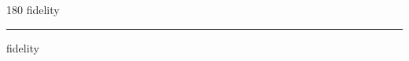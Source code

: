 
\begin{frame}
\begin{center}
\begin{turn}{180}
{\fontsize{2.5cm}{1em}\selectfont fidelity}
\end{turn}
\vspace{1em}\par  
\hrule
\vspace{1em}\par  
{\fontsize{2.5cm}{1em}\selectfont fidelity}
\end{center}
\end{frame}
